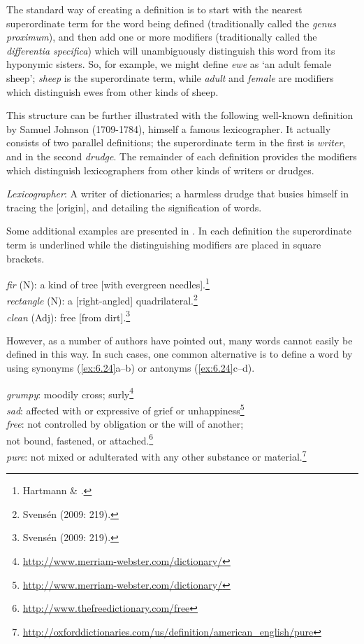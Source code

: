 The standard way of creating a definition is to start with the nearest superordinate term for the word being defined (traditionally called the \textit{genus proximum}), and then add one or more modifiers (traditionally called the \textit{differentia specifica}) which will unambiguously distinguish this word from its hyponymic sisters. So, for example, we might define \textit{ewe} as ‘an adult female sheep’; \textit{sheep} is the superordinate term, while \textit{adult} and \textit{female} are modifiers which distinguish ewes from other kinds of sheep.



This structure can be further illustrated with the following well-known definition by Samuel Johnson (1709-1784), himself a famous lexicographer. It actually consists of two parallel definitions; the superordinate term in the first is \textit{writer}, and in the second \textit{drudge}. The remainder of each definition provides the modifiers which distinguish lexicographers from other kinds of writers or drudges.


\ea \label{ex:6.22}
\textit{Lexicographer}: A writer of dictionaries; a harmless drudge that busies himself in tracing the [origin], and detailing the signification of words.
\z


Some additional examples are presented in . In each definition the superordinate term is underlined while the distinguishing modifiers are placed in square brackets.


\ea \label{ex:6.23}
\ea \textit{fir} (N): a kind of tree [with evergreen needles].\footnote{Hartmann \& \citet[62]{James1998}.}\\
\ex \textit{rectangle} (N): a [right-angled] quadrilateral.\footnote{Svensén (2009: 219).}\\
\ex \textit{clean} (Adj): free [from dirt].\footnote{Svensén (2009: 219).}
                       \z
\z


However, as a number of authors have pointed out, many words cannot easily be defined in this way. In such cases, one common alternative is to define a word by using synonyms (\ref{ex:6.24}a--b) or antonyms (\ref{ex:6.24}c--d).


\ea \label{ex:6.24}
\ea \textit{grumpy}: moodily cross; surly\footnote{\url{http://www.merriam-webster.com/dictionary/}}\\
\ex \textit{sad}: affected with or expressive of grief or unhappiness\footnote{\url{http://www.merriam-webster.com/dictionary/}}\\
\ex \textit{free}: not controlled by obligation or the will of another;\\
  not bound, fastened, or attached.\footnote{\url{http://www.thefreedictionary.com/free}} \\
\ex \textit{pure}: not mixed or adulterated with any other substance or material.\footnote{\url{http://oxforddictionaries.com/us/definition/american_english/pure}} 
                       \z
\z


